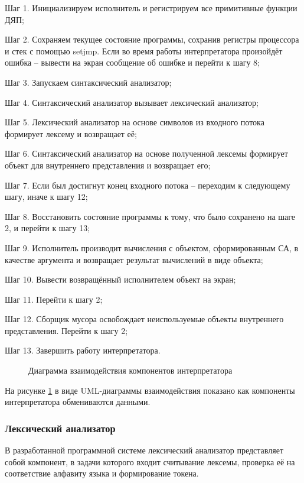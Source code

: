 Шаг 1. Инициализируем исполнитель и регистрируем все примитивные функции ДЯП;

Шаг 2. Сохраняем текущее состояние программы, сохранив регистры процессора и стек с помощью setjmp. Если во время работы интерпретатора произойдёт ошибка -- вывести на экран сообщение об ошибке и перейти к шагу 8;

Шаг 3. Запускаем синтаксический анализатор;

Шаг 4. Синтаксический анализатор вызывает лексический анализатор;

Шаг 5. Лексический анализатор на основе символов из входного потока формирует лексему и возвращает её;

Шаг 6. Синтаксический анализатор на основе полученной лексемы формирует объект для внутреннего представления и возвращает его;

Шаг 7. Если был достигнут конец входного потока -- переходим к следующему шагу, иначе к шагу 12;

Шаг 8. Восстановить состояние программы к тому, что было сохранено на шаге 2, и перейти к шагу 13;

Шаг 9. Исполнитель производит вычисления с объектом, сформированным СА, в качестве аргумента и возвращает результат вычислений в виде объекта;

Шаг 10. Вывести возвращённый исполнителем объект на экран;

Шаг 11. Перейти к шагу 2;

Шаг 12. Сборщик мусора освобождает неиспользуемые объекты внутреннего представления. Перейти к шагу 2;

Шаг 13. Завершить работу интерпретатора.


\begin{figure}[h!t]
	\caption{Диаграмма взаимодействия компонентов интерпретатора}
	\label{uml_coopr:image}
\end{figure}

На рисунке \ref{uml_coopr:image} в виде UML-диаграммы взаимодействия показано как компоненты интерпретатора обмениваются данными.

\subsubsection{Лексический анализатор}
В разработанной программной системе лексический анализатор представляет собой компонент, в задачи которого входит считывание лексемы, проверка её на соответствие алфавиту языка и формирование токена.

